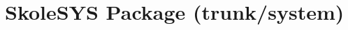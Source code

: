 \documentclass{manual}
\begin{document}
%

\chapter{SkoleSYS Package (trunk/system)\label{skolesys-pack}}




\end{document}
